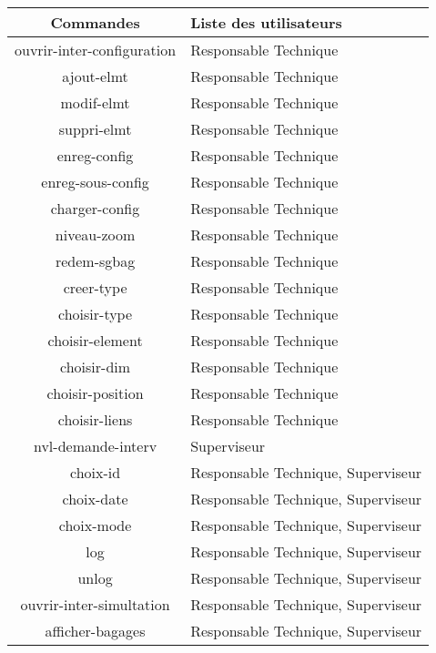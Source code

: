 \begin{center}
\begin{tabular}{|c|p{10cm}|}
	 \hline \textbf{Commandes} & \textbf{Liste des utilisateurs} \\ \hline
	ouvrir-inter-configuration  & {\centering  Responsable Technique }\\ \hline
	ajout-elmt  & {\centering  Responsable Technique }\\ \hline
	modif-elmt  & {\centering  Responsable Technique }\\ \hline
	suppri-elmt  & {\centering  Responsable Technique }\\ \hline
	enreg-config  & {\centering  Responsable Technique }\\ \hline
	enreg-sous-config  & {\centering  Responsable Technique }\\ \hline
	charger-config  & {\centering  Responsable Technique }\\ \hline
	niveau-zoom  & {\centering  Responsable Technique }\\ \hline
	redem-sgbag  & {\centering  Responsable Technique }\\ \hline
	creer-type  & {\centering  Responsable Technique }\\ \hline
	choisir-type  & {\centering  Responsable Technique }\\ \hline
	choisir-element  & {\centering  Responsable Technique }\\ \hline
	choisir-dim  & {\centering  Responsable Technique }\\ \hline
	choisir-position  & {\centering  Responsable Technique }\\ \hline
	choisir-liens  & {\centering  Responsable Technique }\\ \hline
	nvl-demande-interv  & {\centering  Superviseur }\\ \hline
	choix-id  & {\centering  Responsable Technique, Superviseur }\\ \hline
	choix-date  & {\centering  Responsable Technique, Superviseur }\\ \hline
	choix-mode  & {\centering  Responsable Technique, Superviseur }\\ \hline
	log  & {\centering  Responsable Technique, Superviseur }\\ \hline
	unlog  & {\centering  Responsable Technique, Superviseur }\\ \hline
	ouvrir-inter-simultation  & {\centering  Responsable Technique, Superviseur }\\ \hline
	afficher-bagages  & {\centering  Responsable Technique, Superviseur }\\ \hline

\end{tabular}
\end{center}
